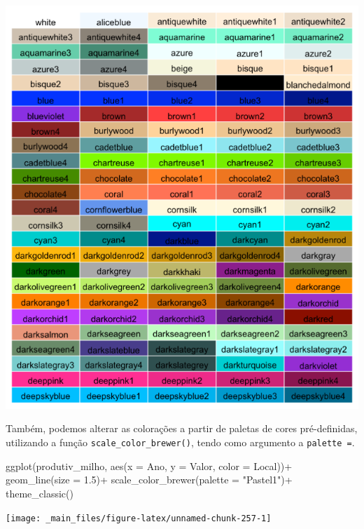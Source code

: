 \documentclass[
  brazilian,
]{book}
\newenvironment{Shaded}{\begin{snugshade}}{\end{snugshade}}
\newcommand{\AttributeTok}[1]{\textcolor[rgb]{0.77,0.63,0.00}{#1}}
\newcommand{\FloatTok}[1]{\textcolor[rgb]{0.00,0.00,0.81}{#1}}
\newcommand{\FunctionTok}[1]{\textcolor[rgb]{0.00,0.00,0.00}{#1}}
\newcommand{\NormalTok}[1]{#1}
\newcommand{\SpecialCharTok}[1]{\textcolor[rgb]{0.00,0.00,0.00}{#1}}
\newcommand{\StringTok}[1]{\textcolor[rgb]{0.31,0.60,0.02}{#1}}
\let\origfigure\figure
\let\endorigfigure\endfigure
\renewenvironment{figure}[1][2] {
    \expandafter\origfigure\expandafter[H]
} {
    \endorigfigure
}
\begin{document}
\begin{figure}

{\centering \includegraphics[width=0.8\linewidth]{imagens/nome_cor} 

}

\caption{Nome das possíveis cores a serem definidas para os gráficos. Fonte: *The R Graph Gallery.*}\label{fig:cornome}
\end{figure}

Também, podemos alterar as colorações a partir de paletas de cores pré-definidas, utilizando a função \texttt{scale\_color\_brewer()}, tendo como argumento a \texttt{palette\ =}.

\begin{Shaded}
\begin{Highlighting}[]
\FunctionTok{ggplot}\NormalTok{(produtiv\_milho, }
       \FunctionTok{aes}\NormalTok{(}\AttributeTok{x =}\NormalTok{ Ano,}
           \AttributeTok{y =}\NormalTok{ Valor,}
           \AttributeTok{color =}\NormalTok{ Local))}\SpecialCharTok{+}
  \FunctionTok{geom\_line}\NormalTok{(}\AttributeTok{size =} \FloatTok{1.5}\NormalTok{)}\SpecialCharTok{+}
  \FunctionTok{scale\_color\_brewer}\NormalTok{(}\AttributeTok{palette =} \StringTok{"Pastel1"}\NormalTok{)}\SpecialCharTok{+}
  \FunctionTok{theme\_classic}\NormalTok{()}
\end{Highlighting}
\end{Shaded}

\begin{center}\texttt{[image: \_main\_files/figure-latex/unnamed-chunk-257-1]} \end{center}
\end{document}
